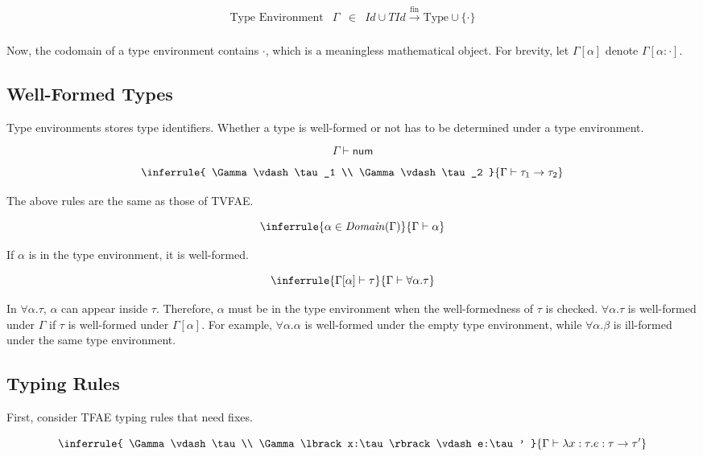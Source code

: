 \[
\begin{array}{rrcl}
\text{Type Environment} & \Gamma & \in &
\mathit{Id}\cup\mathit{TId}\xrightarrow{\text{fin}}
\text{Type}\cup\{\cdot\} \\
\end{array}
\]

Now, the codomain of a type environment contains $\cdot$, which is a
meaningless mathematical object. For brevity, let $\Gamma[\alpha]$ denote
$\Gamma[\alpha:\cdot]$.

\subsection{Well-Formed Types}

Type environments stores type identifiers. Whether a type is well-formed or not
has to be determined under a type environment.

\[\Gamma\vdash\textsf{num}\]

\[
\inferrule
{ \Gamma\vdash\tau_1 \\
  \Gamma\vdash\tau_2 }
{ \Gamma\vdash\tau_1\rightarrow\tau_2 }
\]

The above rules are the same as those of TVFAE.

\[
\inferrule
{ \alpha\in\mathit{Domain}(\Gamma) }
{ \Gamma\vdash\alpha }
\]

If $\alpha$ is in the type environment, it is well-formed.

\[
\inferrule
{ \Gamma\lbrack\alpha\rbrack\vdash\tau }
{ \Gamma\vdash\forall\alpha.\tau }
\]

In $\forall\alpha.\tau$, $\alpha$ can appear inside $\tau$. Therefore,
$\alpha$ must be in the type environment when the well-formedness of $\tau$
is checked. $\forall\alpha.\tau$ is well-formed under $\Gamma$ if $\tau$
is well-formed under $\Gamma[\alpha]$. For example, $\forall\alpha.\alpha$
is well-formed under the empty type environment, while $\forall\alpha.\beta$
is ill-formed under the same type environment.

\subsection{Typing Rules}

First, consider TFAE typing rules that need fixes.

\[
\inferrule
{ \Gamma\vdash\tau \\ \Gamma\lbrack x:\tau\rbrack\vdash e:\tau' }
{ \Gamma\vdash \lambda x:\tau.e:\tau\rightarrow\tau' }
\]

